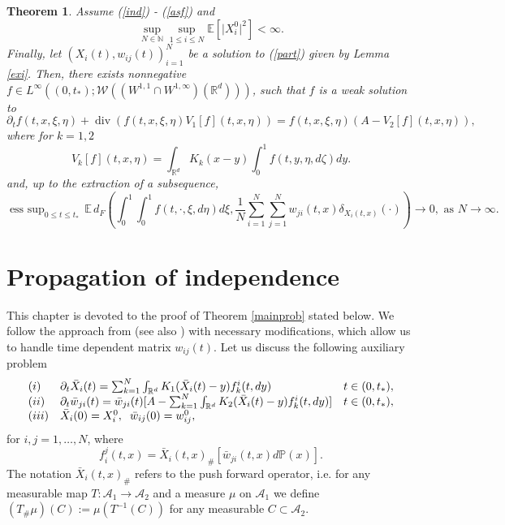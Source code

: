 \documentclass[10pt]{article}
\newtheorem{theo}{Theorem}
\def\divv{\operatorname {div}}
\DeclareMathOperator*{\esssup}{ess~sup}
\newcommand{\eqq}[2]{\begin{equation}  #1  \label{#2}\end{equation}    }
\newcommand{\hd}{\hspace{0.2cm}}
\newcommand{\m}[1]{\mbox{#1}}
\newcommand{\R}{\mathbb{R}}
\newcommand{\izj}{\int_{0}^{1}}
\newcommand{\ird}{\int_{\mathbb{R}^d}}
\newcommand{\sn}{\frac{1}{N}\sum_{i=1}^N}
\newcommand{\xb}{\bar{X}}
\newcommand{\wij}{w_{ij}}
\newcommand{\wijb}{\bar{w}_{ij}}
\newcommand{\wji}{w_{ji}}
\newcommand{\wjib}{\bar{w}_{ji}}
\newcommand{\fji}{f^j_i}
\newcommand{\fik}{f^i_k}
\newcommand{\W}{\mathcal{W}}
\begin{document}
  \begin{theo} \label{maintheorem}
Assume (\ref{ind}) - (\ref{asf}) and 
\eqq{
\sup_{N\in \mathbb{N}} \sup_{1\leq i\leq N}\mathbb{E}[\vert X_i^0\vert^2]<\infty.
}{secmo}
Finally, let $(X_i(t), \wij(t))_{i=1}^N$ be a solution to (\ref{part}) given by Lemma \ref{exi}. 
Then, there exists nonnegative $f\in L^\infty((0, t_*);\W((W^{1,1}\cap W^{1,\infty})(\R^d)))$,  such that $f$ is a weak solution to
\eqq{
\partial_t f(t,x,\xi,\eta) + \divv ( f(t,x,\xi,\eta) V_1[f](t,x,\eta)) =  f(t,x,\xi,\eta) (A -V_2[f](t,x,\eta)), 
}{meanmean}
where for $k=1,2$
\[
V_k[f](t,x,\eta) =  \ird  K_{k}(x-y)\izj f(t,y,\eta,d\zeta)dy.
\]
 and, up to the extraction of a subsequence,
\eqq{
\esssup_{0\leq t\leq t_*}\,\mathbb{E}\,d_{F}\left(\int_0^1 \izj f(t,\cdot,\xi,d\eta)d\xi, \sn \sum_{j=1}^N \wji(t,x)\delta_{X_i(t,x)}(\cdot)\right)\to 0, \m{ as } N\rightarrow \infty.
}{finalfinal}
 \end{theo}




\section{Propagation of independence}

This chapter is devoted to the proof of Theorem \ref{mainprob} stated below. We follow the approach from \cite[Chapter 2]{nasza}  (see also \cite{JPS2025}) with necessary modifications, which allow us to handle time dependent matrix $w_{ij}(t)$.
Let us discuss the following auxiliary problem
\begin{equation}\label{part2}
\begin{array}{lll}
(i) & \partial_t \xb_i(t) = \sum_{k=1}^N  \ird K_{1}(\xb_i(t)-y)\fik(t,dy) & t \in (0,t_*),\\
(ii) & \partial_t \wjib(t) = \wjib(t)[A-\sum_{k=1}^N \ird K_{2}(\xb_i(t)-y)\fik(t,dy)] & t \in  (0,t_*),\\
(iii) & \xb_i(0) = X_{i}^0, \hd \wijb(0) = \wij^0,
\end{array}
\end{equation}
for $i,j=1,\dots, N$, where 
\eqq{
\fji(t,x) = \xb_i(t,x)_{\#}[\wjib(t,x)d\mathbb{P}(x)].
}{defft}
The notation  $\xb_i(t,x)_{\#}$ refers to the push forward operator, i.e. for any measurable map $T:\mathcal{A}_1\rightarrow \mathcal{A}_2$ and a measure $\mu$ on $\mathcal{A}_1$ we define $(T_{\#}\mu)(C):=\mu(T^{-1}(C))$ for any measurable $C \subset \mathcal{A}_2$.
\end{document}
